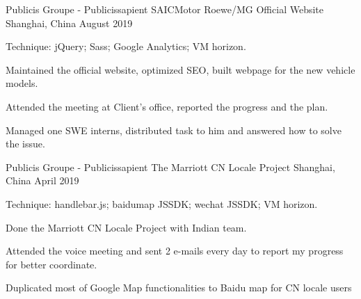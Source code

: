 \begin{cventries}
    
    \cventry
    {Publicis Groupe - Publicissapient} %
    {SAICMotor Roewe/MG Official Website} %
    {Shanghai, China} %
    {August 2019} %
    {
      \begin{cvitems} %
        \item {Technique: jQuery; Sass; Google Analytics; VM horizon.}
        \item {Maintained the official website, optimized SEO, built webpage for the new vehicle models.}
        \item {Attended the meeting at Client's office, reported the progress and the plan.}
        \item {Managed one SWE interns, distributed task to him and answered how to solve the issue.}
      \end{cvitems}
    }
    
    
    \cventry
    {Publicis Groupe - Publicissapient} %
    {The Marriott CN Locale Project} %
    {Shanghai, China} %
    {April 2019} %
    {
      \begin{cvitems} %
        \item {Technique: handlebar.js; baidumap JSSDK; wechat JSSDK; VM horizon.}
        \item {Done the Marriott CN Locale Project with Indian team.}
        \item {Attended the voice meeting and sent 2 e-mails every day to report my progress for better coordinate.}
        \item {Duplicated most of Google Map functionalities to Baidu map for CN locale users}
      \end{cvitems}
    }

\end{cventries}
